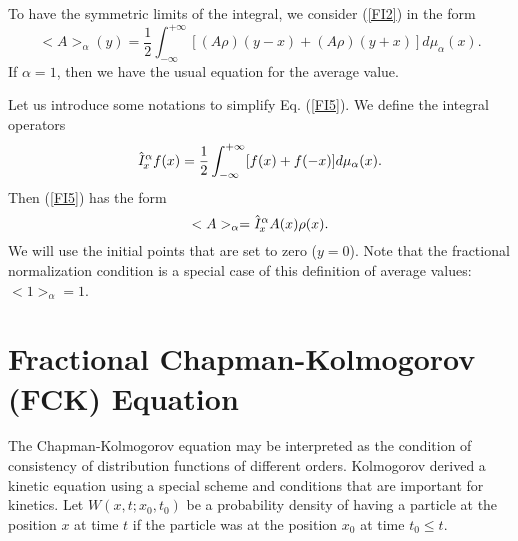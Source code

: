 \documentclass[12pt]{article}
\newcommand{\be}{\begin{equation}}
\newcommand{\ee}{\end{equation}}
\begin{document}
To have the symmetric limits of the integral, 
we consider (\ref{FI2}) in the form
\be \label{FI5} <A>_{\alpha}(y)= \frac{1}{2}
\int^{+\infty}_{-\infty} [ (A\rho)(y-x)+ (A\rho)(y+x) ] d\mu_{\alpha}(x) . \ee
If $\alpha=1$, then we have the usual equation for the average value.

Let us introduce some notations to simplify Eq. (\ref{FI5}).
We define the integral operators
\be \label{hatI}
\hat {\it I}^{\alpha}_{x} f(x)=\frac{1}{2}
\int^{+\infty}_{-\infty} [ f(x)+ f(-x) ] d\mu_{\alpha}(x) .
\ee
Then (\ref{FI5}) has the form
\be \label{av1}
<A>_{\alpha}=\hat {\it I}^{\alpha}_{x} A(x)\rho(x) .
\ee
We will use the initial points that are set to zero ($y=0$).
Note that the fractional normalization condition is a special case
of this definition of average values: $<1>_{\alpha}=1$. 



\section{Fractional Chapman-Kolmogorov (FCK) Equation}


The Chapman-Kolmogorov equation \cite{Kolm1,Kolm2} 
may be interpreted as the condition of
consistency of distribution functions of different orders.
Kolmogorov \cite{Kolm1,Kolm2} derived a kinetic equation using a 
special scheme and conditions that are important for kinetics. 
Let $W(x,t;x_0,t_0)$ be a probability density of having a particle 
at the position $x$ at time $t$ if the particle was at the position $x_0$ 
at time $t_0\le t$. 
\end{document}
